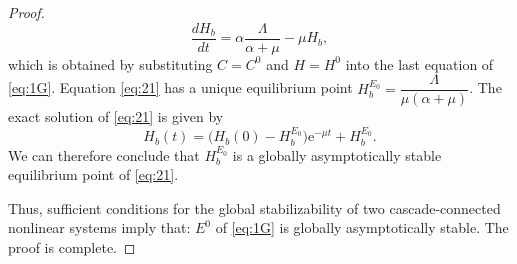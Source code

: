 \documentclass[11pt]{article}
\theoremstyle{definition}
\theoremstyle{remark}
\numberwithin{equation}{section}
\begin{document}
\begin{proof}
\begin{equation}\label{eq:21}
\dfrac{d H_b}{dt} = \alpha \dfrac{\Lambda}{\alpha + \mu} - \mu H_b,
\end{equation}
which is obtained by substituting $C = C^0$ and $H = H^0$ into the last equation of \eqref{eq:1G}. 
Equation \eqref{eq:21} has a unique equilibrium point $H_b^{E_0} = \dfrac{\Lambda}{\mu(\alpha + \mu)}$. 
The exact solution of \eqref{eq:21} is given by
\begin{equation*}
H_b(t) = \bigg(H_b(0) - H_b^{E_0}\bigg)\mathrm{e}^{-\mu t} + H_b^{E_0}.
\end{equation*}
We can therefore conclude that $H_b^{E_0}$ is a globally asymptotically stable equilibrium point of \eqref{eq:21}.

Thus, sufficient conditions for the global stabilizability of two cascade-connected nonlinear systems \cite{Seibert} imply that: $E^0$ of \eqref{eq:1G} is globally asymptotically stable. The proof is complete.
\end{proof}
\end{document}
